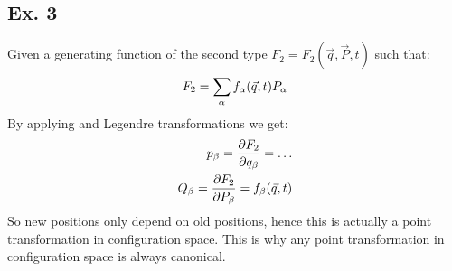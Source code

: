 \subsection{Ex. 3}
Given a generating function of the second type $F_2 = F_2(\vec{q},\vec{P},t)$ such that:
\begin{equation}
    F_2 = \displaystyle\sum_{\alpha} f_{\alpha}(\vec{q},t) P_{\alpha}
\end{equation}
By applying \hamiltonref\;and Legendre transformations we get:
\begin{equation}
    \begin{split}
        p_{\beta} = \dfrac{\partial F_2}{\partial q_{\beta}} = \dots\\
        Q_{\beta} = \dfrac{\partial F_2}{\partial P_{\beta}} = f_{\beta}(\vec{q},t)
    \end{split}
\end{equation}
So new positions only depend on old positions, hence this is actually a point transformation in configuration space. This is why any point transformation in configuration space is always canonical.

